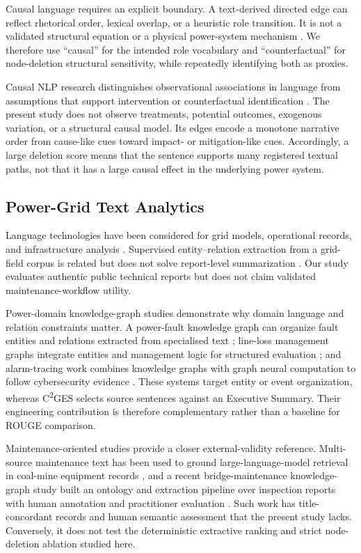 \documentclass[applsci,article,submit,moreauthors]{Definitions/mdpi}
\newcommand{\cges}{C\textsuperscript{2}GES}
\begin{document}
Causal language requires an explicit boundary. A text-derived directed edge can reflect rhetorical order, lexical overlap, or a heuristic role transition. It is not a validated structural equation or a physical power-system mechanism \cite{feder2022causal}. We therefore use ``causal'' for the intended role vocabulary and ``counterfactual'' for node-deletion structural sensitivity, while repeatedly identifying both as proxies.

Causal NLP research distinguishes observational associations in language from assumptions that support intervention or counterfactual identification \cite{feder2022causal,du2022ecare}. The present study does not observe treatments, potential outcomes, exogenous variation, or a structural causal model. Its edges encode a monotone narrative order from cause-like cues toward impact- or mitigation-like cues. Accordingly, a large deletion score means that the sentence supports many registered textual paths, not that it has a large causal effect in the underlying power system.

\subsection{Power-Grid Text Analytics}

Language technologies have been considered for grid models, operational records, and infrastructure analysis \cite{xie2022massively,hamann2024foundation,madabhushi2023survey,srinivasan2023artificial}. Supervised entity--relation extraction from a grid-field corpus is related but does not solve report-level summarization \cite{meng2023gridfield}. Our study evaluates authentic public technical reports but does not claim validated maintenance-workflow utility.

Power-domain knowledge-graph studies demonstrate why domain language and relation constraints matter. A power-fault knowledge graph can organize fault entities and relations extracted from specialised text \cite{liu2022powerfault}; line-loss management graphs integrate entities and management logic for structured evaluation \cite{li2024lineloss}; and alarm-tracing work combines knowledge graphs with graph neural computation to follow cybersecurity evidence \cite{ma2025alarm}. These systems target entity or event organization, whereas \cges{} selects source sentences against an Executive Summary. Their engineering contribution is therefore complementary rather than a baseline for ROUGE comparison.

Maintenance-oriented studies provide a closer external-validity reference. Multi-source maintenance text has been used to ground large-language-model retrieval in coal-mine equipment records \cite{cao2024coalmaintenance}, and a recent bridge-maintenance knowledge-graph study built an ontology and extraction pipeline over inspection reports with human annotation and practitioner evaluation \cite{zgg2026bridge}. Such work has title-concordant records and human semantic assessment that the present study lacks. Conversely, it does not test the deterministic extractive ranking and strict node-deletion ablation studied here.
\end{document}
